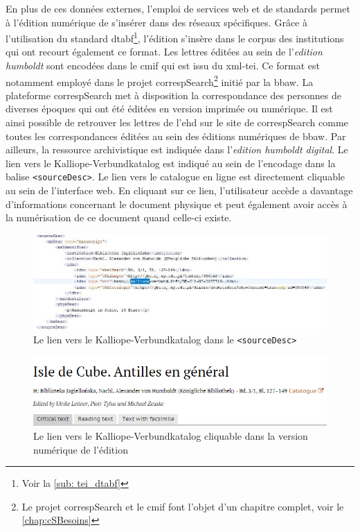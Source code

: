 \documentclass[a4paper, 12pt, twoside]{book}
\begin{document}
En plus de ces données externes, l'emploi de services web et de standards permet à l'édition numérique de s'insérer dans des réseaux spécifiques. Grâce à l'utilisation du standard \gls{dtabf}\footnote{Voir la \autoref{sub: tei_dtabf}}, l'édition s'insère dans le corpus des institutions qui ont recourt également ce format. Les lettres éditées au sein de l'\textit{edition humboldt} sont encodées dans le \gls{cmif} qui est issu du \gls{xml}-\gls{tei}. Ce format est notamment employé dans le projet correspSearch\footnote{Le projet correspSearch et le \gls{cmif} font l'objet d'un chapitre complet, voir le \autoref{chap:cSBesoins}} initié par la \gls{bbaw}. La plateforme correspSearch met à disposition la correspondance des personnes de diverses époques qui ont été éditées en version imprimée ou numérique. Il est ainsi possible de retrouver les lettres de l'\gls{ehd} sur le site de correspSearch comme toutes les correspondances éditées au sein des éditions numériques de \gls{bbaw}. Par ailleurs, la ressource archivistique est indiquée dans l'\textit{edition humboldt digital}. Le lien vers le Kalliope-Verbundkatalog est indiqué au sein de l'encodage dans la balise \texttt{<sourceDesc>}. Le lien vers le catalogue en ligne est directement cliquable au sein de l'interface web. En cliquant sur ce lien, l'utilisateur accède a davantage d'informations concernant le document physique et peut également avoir accès à la numérisation de ce document quand celle-ci existe. 
\begin{figure}[h!]
    \centering
    \includegraphics[width=15cm]{img/edh_kalliope_xml.jpg}
    \caption{Le lien vers le Kalliope-Verbundkatalog dans le \texttt{<sourceDesc>}}
    \label{fig:kalliopeLinkXML}
    \hfill
\end{figure}
\begin{figure}[h!]
    \centering
    \includegraphics[width=13cm]{img/edh_kalliopelink.png}
    \caption{Le lien vers le Kalliope-Verbundkatalog cliquable dans la version numérique de l'édition}
    \label{fig:kalliopeLinInterface}
    \hfill
\end{figure}
\end{document}
